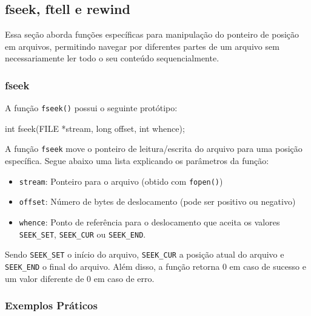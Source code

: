\subsection{fseek, ftell e rewind}

Essa seção aborda funções específicas para manipulação do ponteiro de posição 
em arquivos, permitindo navegar por diferentes partes de um arquivo sem 
necessariamente ler todo o seu conteúdo sequencialmente.

\subsubsection{fseek}

A função \texttt{fseek()} possui o seguinte protótipo:

\begin{excode}
int fseek(FILE *stream, long offset, int whence);
\end{excode}

A função \texttt{fseek} move o ponteiro de leitura/escrita do arquivo para uma 
posição específica. Segue abaixo uma lista explicando os parâmetros da função:

\begin{itemize}
    \item \texttt{stream}: Ponteiro para o arquivo (obtido com \texttt{fopen()})
    \item \texttt{offset}: Número de bytes de deslocamento (pode ser positivo ou negativo)
    \item \texttt{whence}: Ponto de referência para o deslocamento que aceita os valores \texttt{SEEK\_SET}, \texttt{SEEK\_CUR} ou \texttt{SEEK\_END}.
\end{itemize}

Sendo \texttt{SEEK\_SET} o início do arquivo, \texttt{SEEK\_CUR} a posição atual do arquivo e \texttt{SEEK\_END} 
o final do arquivo. Além disso, a função retorna 0 em caso de sucesso e um valor diferente de 0 em caso de erro.

\subsubsection{Exemplos Práticos}

